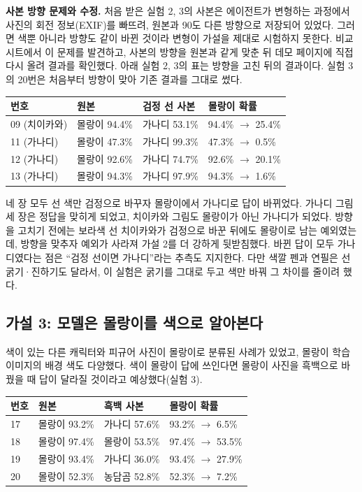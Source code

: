 \documentclass[11pt]{article}
\begin{document}
\textbf{사본 방향 문제와 수정.} 처음 받은 실험 2, 3의 사본은 에이전트가
변형하는 과정에서 사진의 회전 정보(EXIF)를 빠뜨려, 원본과 90도 다른 방향으로
저장되어 있었다. 그러면 색뿐 아니라 방향도 같이 바뀐 것이라 변형이 가설을
제대로 시험하지 못한다. 비교 시트에서 이 문제를 발견하고, 사본의 방향을
원본과 같게 맞춘 뒤 데모 페이지에 직접 다시 올려 결과를 확인했다.
아래 실험 2, 3의 표는 방향을 고친 뒤의 결과이다. 실험 3의 20번은 처음부터
방향이 맞아 기존 결과를 그대로 썼다.

\begin{center}
\begin{tabular}{llll}
\toprule
번호 & 원본 & 검정 선 사본 & 몰랑이 확률 \\
\midrule
09 (치이카와) & 몰랑이 94.4\% & 가나디 53.1\% & 94.4\% $\rightarrow$ 25.4\% \\
11 (가나디) & 몰랑이 47.3\% & 가나디 99.3\% & 47.3\% $\rightarrow$ 0.5\% \\
12 (가나디) & 몰랑이 92.6\% & 가나디 74.7\% & 92.6\% $\rightarrow$ 20.1\% \\
13 (가나디) & 몰랑이 94.3\% & 가나디 97.9\% & 94.3\% $\rightarrow$ 1.6\% \\
\bottomrule
\end{tabular}
\end{center}

네 장 모두 선 색만 검정으로 바꾸자 몰랑이에서 가나디로 답이 바뀌었다.
가나디 그림 세 장은 정답을 맞히게 되었고, 치이카와 그림도 몰랑이가 아닌
가나디가 되었다. 방향을 고치기 전에는 보라색 선 치이카와가 검정으로 바꾼
뒤에도 몰랑이로 남는 예외였는데, 방향을 맞추자 예외가 사라져 가설 2를 더
강하게 뒷받침했다. 바뀐 답이 모두 가나디였다는 점은 ``검정 선이면
가나디''라는 추측도 지지한다. 다만 색깔 펜과 연필은 선 굵기·진하기도 달라서,
이 실험은 굵기를 그대로 두고 색만 바꿔 그 차이를 줄이려 했다.

\subsection*{가설 3: 모델은 몰랑이를 색으로 알아본다}
색이 있는 다른 캐릭터와 피규어 사진이 몰랑이로 분류된 사례가 있었고,
몰랑이 학습 이미지의 배경 색도 다양했다. 색이 몰랑이 답에 쓰인다면
몰랑이 사진을 흑백으로 바꿨을 때 답이 달라질 것이라고 예상했다(실험 3).

\begin{center}
\begin{tabular}{llll}
\toprule
번호 & 원본 & 흑백 사본 & 몰랑이 확률 \\
\midrule
17 & 몰랑이 93.2\% & 가나디 57.6\% & 93.2\% $\rightarrow$ 6.5\% \\
18 & 몰랑이 97.4\% & 몰랑이 53.5\% & 97.4\% $\rightarrow$ 53.5\% \\
19 & 몰랑이 93.4\% & 가나디 36.0\% & 93.4\% $\rightarrow$ 27.9\% \\
20 & 몰랑이 52.3\% & 농담곰 52.8\% & 52.3\% $\rightarrow$ 7.2\% \\
\bottomrule
\end{tabular}
\end{center}
\end{document}
